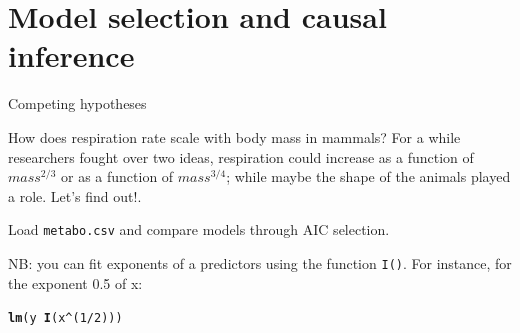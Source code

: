 \documentclass[10pt]{beamer}\usepackage[]{graphicx}\usepackage[]{color}
\makeatletter
\newcommand{\hlnum}[1]{\textcolor[rgb]{0.686,0.059,0.569}{#1}}%
\newcommand{\hlopt}[1]{\textcolor[rgb]{0,0,0}{#1}}%
\newcommand{\hlstd}[1]{\textcolor[rgb]{0.345,0.345,0.345}{#1}}%
\newcommand{\hlkwd}[1]{\textcolor[rgb]{0.737,0.353,0.396}{\textbf{#1}}}%
\newenvironment{kframe}{%
 \def\at@end@of@kframe{}%
 \ifinner\ifhmode%
  \def\at@end@of@kframe{\end{minipage}}%
  \begin{minipage}{\columnwidth}%
 \fi\fi%
 \def\FrameCommand##1{\hskip\@totalleftmargin \hskip-\fboxsep
 \colorbox{shadecolor}{##1}\hskip-\fboxsep
     \hskip-\linewidth \hskip-\@totalleftmargin \hskip\columnwidth}%
 \MakeFramed {\advance\hsize-\width
   \@totalleftmargin\z@ \linewidth\hsize
   \@setminipage}}%
 {\par\unskip\endMakeFramed%
 \at@end@of@kframe}
\newenvironment{knitrout}{}{} %
\makeatother
\begin{document}
\section{Model selection and causal inference}

\begin{frame}[fragile]{Competing hypotheses}



How does respiration rate scale with body mass in mammals? For a while researchers fought over two ideas, respiration could increase as a function of $mass^{2/3}$ or as a function of $mass^{3/4}$; while maybe the shape of the animals played a role. Let's find out!.

Load \texttt{metabo.csv} and compare models through AIC selection.

NB: you can fit exponents of a predictors using the function \texttt{I()}. For instance, for the exponent 0.5 of x:
\begin{knitrout}\small
{}\color{fgcolor}\begin{kframe}
\begin{alltt}
\hlkwd{lm}\hlstd{(y} \hlopt{~} \hlkwd{I}\hlstd{(x}\hlopt{^}\hlstd{(}\hlnum{1}\hlopt{/}\hlnum{2}\hlstd{)))}
\end{alltt}
\end{kframe}
\end{knitrout}

\end{frame}
\end{document}

